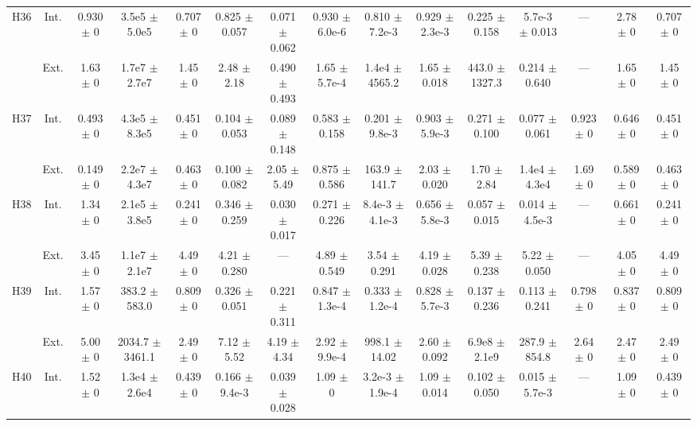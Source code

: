 \begin{table}[htbp]
{\begin{tabular}{@{}ccccccccccccccc@{}}
\cline{2-15}
\multirow{2}{*}{H36} & Int. & 0.930 $\pm$ 0 & 3.5e5 $\pm$ 5.0e5 & 0.707 $\pm$ 0 & 0.825 $\pm$ 0.057 & 0.071 $\pm$ 0.062 & 0.930 $\pm$ 6.0e-6 & 0.810 $\pm$ 7.2e-3 & 0.929 $\pm$ 2.3e-3 & 0.225 $\pm$ 0.158 & 5.7e-3 $\pm$ 0.013 & --- & 2.78 $\pm$ 0 & 0.707 $\pm$ 0 \\
 & Ext. & 1.63 $\pm$ 0 & 1.7e7 $\pm$ 2.7e7 & 1.45 $\pm$ 0 & 2.48 $\pm$ 2.18 & 0.490 $\pm$ 0.493 & 1.65 $\pm$ 5.7e-4 & 1.4e4 $\pm$ 4565.2 & 1.65 $\pm$ 0.018 & 443.0 $\pm$ 1327.3 & 0.214 $\pm$ 0.640 & --- & 1.65 $\pm$ 0 & 1.45 $\pm$ 0 \\
\cline{2-15}
\multirow{2}{*}{H37} & Int. & 0.493 $\pm$ 0 & 4.3e5 $\pm$ 8.3e5 & 0.451 $\pm$ 0 & 0.104 $\pm$ 0.053 & 0.089 $\pm$ 0.148 & 0.583 $\pm$ 0.158 & 0.201 $\pm$ 9.8e-3 & 0.903 $\pm$ 5.9e-3 & 0.271 $\pm$ 0.100 & 0.077 $\pm$ 0.061 & 0.923 $\pm$ 0 & 0.646 $\pm$ 0 & 0.451 $\pm$ 0 \\
 & Ext. & 0.149 $\pm$ 0 & 2.2e7 $\pm$ 4.3e7 & 0.463 $\pm$ 0 & 0.100 $\pm$ 0.082 & 2.05 $\pm$ 5.49 & 0.875 $\pm$ 0.586 & 163.9 $\pm$ 141.7 & 2.03 $\pm$ 0.020 & 1.70 $\pm$ 2.84 & 1.4e4 $\pm$ 4.3e4 & 1.69 $\pm$ 0 & 0.589 $\pm$ 0 & 0.463 $\pm$ 0 \\
\cline{2-15}
\multirow{2}{*}{H38} & Int. & 1.34 $\pm$ 0 & 2.1e5 $\pm$ 3.8e5 & 0.241 $\pm$ 0 & 0.346 $\pm$ 0.259 & 0.030 $\pm$ 0.017 & 0.271 $\pm$ 0.226 & 8.4e-3 $\pm$ 4.1e-3 & 0.656 $\pm$ 5.8e-3 & 0.057 $\pm$ 0.015 & 0.014 $\pm$ 4.5e-3 & --- & 0.661 $\pm$ 0 & 0.241 $\pm$ 0 \\
 & Ext. & 3.45 $\pm$ 0 & 1.1e7 $\pm$ 2.1e7 & 4.49 $\pm$ 0 & 4.21 $\pm$ 0.280 & --- & 4.89 $\pm$ 0.549 & 3.54 $\pm$ 0.291 & 4.19 $\pm$ 0.028 & 5.39 $\pm$ 0.238 & 5.22 $\pm$ 0.050 & --- & 4.05 $\pm$ 0 & 4.49 $\pm$ 0 \\
\cline{2-15}
\multirow{2}{*}{H39} & Int. & 1.57 $\pm$ 0 & 383.2 $\pm$ 583.0 & 0.809 $\pm$ 0 & 0.326 $\pm$ 0.051 & 0.221 $\pm$ 0.311 & 0.847 $\pm$ 1.3e-4 & 0.333 $\pm$ 1.2e-4 & 0.828 $\pm$ 5.7e-3 & 0.137 $\pm$ 0.236 & 0.113 $\pm$ 0.241 & 0.798 $\pm$ 0 & 0.837 $\pm$ 0 & 0.809 $\pm$ 0 \\
 & Ext. & 5.00 $\pm$ 0 & 2034.7 $\pm$ 3461.1 & 2.49 $\pm$ 0 & 7.12 $\pm$ 5.52 & 4.19 $\pm$ 4.34 & 2.92 $\pm$ 9.9e-4 & 998.1 $\pm$ 14.02 & 2.60 $\pm$ 0.092 & 6.9e8 $\pm$ 2.1e9 & 287.9 $\pm$ 854.8 & 2.64 $\pm$ 0 & 2.47 $\pm$ 0 & 2.49 $\pm$ 0 \\
\cline{2-15}
\multirow{2}{*}{H40} & Int. & 1.52 $\pm$ 0 & 1.3e4 $\pm$ 2.6e4 & 0.439 $\pm$ 0 & 0.166 $\pm$ 9.4e-3 & 0.039 $\pm$ 0.028 & 1.09 $\pm$ 0 & 3.2e-3 $\pm$ 1.9e-4 & 1.09 $\pm$ 0.014 & 0.102 $\pm$ 0.050 & 0.015 $\pm$ 5.7e-3 & --- & 1.09 $\pm$ 0 & 0.439 $\pm$ 0 \\

\end{tabular}}
\end{table}
